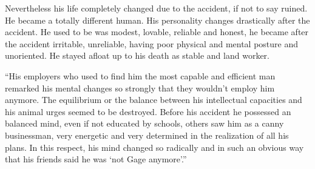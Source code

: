 \documentclass[../main.tex]{subfiles}
\begin{document}
{        Nevertheless his life completely changed due to the accident, if not to say ruined. He became a totally different human. His personality changes drastically after the accident. He used to be was modest, lovable, reliable and honest, he became after the accident irritable, unreliable, having poor physical and mental posture and unoriented. He stayed afloat up to his death as stable and land worker.

        ``His employers who used to find him the most capable and efficient man remarked his mental changes so strongly that they wouldn't employ him anymore. The equilibrium or the balance between his intellectual capacities and his animal urges seemed to be destroyed. Before his accident he possessed an balanced mind, even if not educated by schools, others saw him as a canny businessman, very energetic and very determined in the realization of all his plans. In this respect, his mind changed so radically and in such an obvious way that his friends said he was `not Gage anymore'.''
      }
\end{document}
